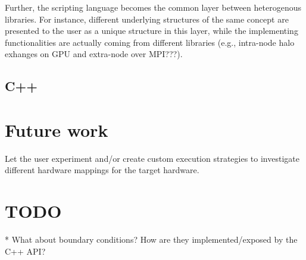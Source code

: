 \documentclass[english]{article}
\begin{document}
Further, the scripting language becomes the common layer between heterogenous libraries.
For instance, different underlying structures of the same concept are presented to the user as a unique structure in this layer, while the implementing functionalities are actually coming from different libraries (e.g., intra-node halo exhanges on GPU and extra-node over MPI???).

\subsection{C++}

\section{Future work}
Let the user experiment and/or create custom execution strategies to investigate different hardware mappings for the target hardware.

\section{TODO}
* What about boundary conditions? How are they implemented/exposed by the C++ API?
\end{document}
